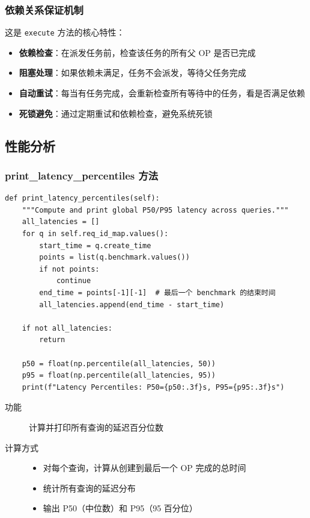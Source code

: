 \documentclass[12pt,a4paper]{article}
\begin{document}
\subsubsection{依赖关系保证机制}

这是 \texttt{execute} 方法的核心特性：

\begin{itemize}
    \item \textbf{依赖检查}：在派发任务前，检查该任务的所有父 OP 是否已完成
    \item \textbf{阻塞处理}：如果依赖未满足，任务不会派发，等待父任务完成
    \item \textbf{自动重试}：每当有任务完成，会重新检查所有等待中的任务，看是否满足依赖
    \item \textbf{死锁避免}：通过定期重试和依赖检查，避免系统死锁
\end{itemize}

\subsection{性能分析}

\subsubsection{print\_latency\_percentiles 方法}

\begin{lstlisting}
def print_latency_percentiles(self):
    """Compute and print global P50/P95 latency across queries."""
    all_latencies = []
    for q in self.req_id_map.values():
        start_time = q.create_time
        points = list(q.benchmark.values())
        if not points:
            continue
        end_time = points[-1][-1]  # 最后一个 benchmark 的结束时间
        all_latencies.append(end_time - start_time)
    
    if not all_latencies:
        return
    
    p50 = float(np.percentile(all_latencies, 50))
    p95 = float(np.percentile(all_latencies, 95))
    print(f"Latency Percentiles: P50={p50:.3f}s, P95={p95:.3f}s")
\end{lstlisting}

\begin{description}
    \item[功能] 计算并打印所有查询的延迟百分位数
    \item[计算方式]
    \begin{itemize}
        \item 对每个查询，计算从创建到最后一个 OP 完成的总时间
        \item 统计所有查询的延迟分布
        \item 输出 P50（中位数）和 P95（95 百分位）
    \end{itemize}
\end{description}
\end{document}
